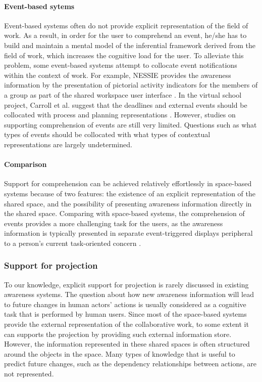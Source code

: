 \paragraph*{Event-based sytems} %
\label{par:event_based_sytems}
Event-based systems often do not provide explicit representation of the field of work. As a result, in order for the user to comprehend an event, he/she has to build and maintain a mental model of the inferential framework derived from the field of work, which increases the cognitive load for the user. To alleviate this problem, some event-based systems attempt to collocate event notifications within the context of work. For example, NESSIE provides the awareness information by the presentation of pictorial activity indicators for the members of a group as part of the shared workspace user interface \cite{prinz1999a}. In the virtual school project, Carroll et al. suggest that the deadlines and external events should be collocated with process and planning representations \cite{carroll2003a}. However, studies on supporting comprehension of events are still very limited. Questions such as what types of events should be collocated with what types of contextual representations are largely undetermined.

\paragraph*{Comparison} %
\label{par:comparison}
Support for comprehension can be achieved relatively effortlessly in space-based systems because of two features: the existence of an explicit representation of the shared space, and the possibility of presenting awareness information directly in the shared space. Comparing with space-based systems, the comprehension of events provides a more challenging task for the users, as the awareness information is typically presented in separate event-triggered displays peripheral to a person's current task-oriented concern \cite{carroll2003a}. 

\subsubsection{Support for projection} %
\label{ssub:support_for_projection}
To our knowledge, explicit support for projection is rarely discussed in existing awareness systems. The question about how new awareness information will lead to future changes in human actors' actions is usually considered as a cognitive task that is performed by human users. Since most of the space-based systems provide the external representation of the collaborative work, to some extent it can supports the projection by providing such external information store. However, the information represented in these shared spaces is often structured around the objects in the space. Many types of knowledge that is useful to predict future changes, such as the dependency relationships between actions, are not represented.

